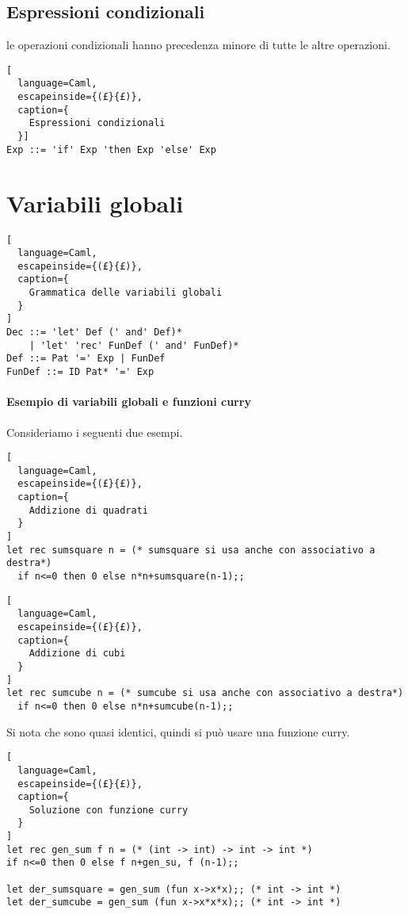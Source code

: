 \subsection{Espressioni condizionali}
le operazioni condizionali hanno precedenza minore di tutte le altre
operazioni.

\begin{lstlisting}[
  language=Caml,
  escapeinside={(£}{£)},
  caption={
    Espressioni condizionali
  }]
Exp ::= 'if' Exp 'then Exp 'else' Exp
\end{lstlisting}

\section{Variabili globali}
\begin{lstlisting}[
  language=Caml,
  escapeinside={(£}{£)},
  caption={
    Grammatica delle variabili globali
  }
]
Dec ::= 'let' Def (' and' Def)*
    | 'let' 'rec' FunDef (' and' FunDef)*
Def ::= Pat '=' Exp | FunDef
FunDef ::= ID Pat* '=' Exp
\end{lstlisting}

\paragraph{Esempio di variabili globali e funzioni curry}
Consideriamo i seguenti due esempi.
\begin{lstlisting}[
  language=Caml,
  escapeinside={(£}{£)},
  caption={
    Addizione di quadrati
  }
]
let rec sumsquare n = (* sumsquare si usa anche con associativo a destra*)
  if n<=0 then 0 else n*n+sumsquare(n-1);;
\end{lstlisting}

\begin{lstlisting}[
  language=Caml,
  escapeinside={(£}{£)},
  caption={
    Addizione di cubi
  }
]
let rec sumcube n = (* sumcube si usa anche con associativo a destra*)
  if n<=0 then 0 else n*n+sumcube(n-1);;
\end{lstlisting}


Si nota che sono quasi identici, quindi si può usare una funzione curry.

\begin{lstlisting}[
  language=Caml,
  escapeinside={(£}{£)},
  caption={
    Soluzione con funzione curry
  }
]
let rec gen_sum f n = (* (int -> int) -> int -> int *)
if n<=0 then 0 else f n+gen_su, f (n-1);;

let der_sumsquare = gen_sum (fun x->x*x);; (* int -> int *)
let der_sumcube = gen_sum (fun x->x*x*x);; (* int -> int *)
\end{lstlisting}

